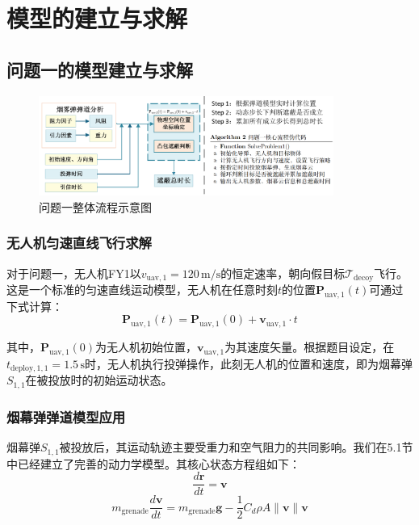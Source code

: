 \documentclass[fontset=SimSun]{ctexart}
\begin{document}
\section{模型的建立与求解}
\subsection{问题一的模型建立与求解}

\begin{figure}[H]
    \centering
    \includegraphics[width=0.86\textwidth]{7.问题1流程图.png}
    \caption{问题一整体流程示意图}
    \label{fig:obscuration_cases}
\end{figure}


\subsubsection{无人机匀速直线飞行求解}
对于问题一，无人机FY1以$v_{\text{uav},1} = 120 \, \text{m/s}$的恒定速率，朝向假目标$\mathcal{T}_{\text{decoy}}$飞行。这是一个标准的匀速直线运动模型，无人机在任意时刻$t$的位置$\mathbf{P}_{\text{uav},1}(t)$可通过下式计算：
\begin{equation}
    \mathbf{P}_{\text{uav},1}(t) = \mathbf{P}_{\text{uav},1}(0) + \mathbf{v}_{\text{uav},1} \cdot t
\end{equation}

其中，$\mathbf{P}_{\text{uav},1}(0)$为无人机初始位置，$\mathbf{v}_{\text{uav},1}$为其速度矢量。根据题目设定，在$t_{\text{deploy},1,1} = 1.5 \, \text{s}$时，无人机执行投弹操作，此刻无人机的位置和速度，即为烟幕弹$S_{1,1}$在被投放时的初始运动状态。

\subsubsection{烟幕弹弹道模型应用}
烟幕弹$S_{1,1}$被投放后，其运动轨迹主要受重力和空气阻力的共同影响。我们在5.1节中已经建立了完善的动力学模型。其核心状态方程组如下：
\begin{equation}
    \frac{d\mathbf{r}}{dt} = \mathbf{v}
\end{equation}
\begin{equation}
    m_{\text{grenade}}\frac{d\mathbf{v}}{dt} = m_{\text{grenade}}\mathbf{g} - \frac{1}{2} C_d \rho A \lVert\mathbf{v}\rVert \mathbf{v}
\end{equation}
\end{document}
